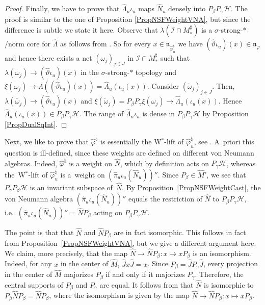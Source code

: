\documentclass[11pt]{article}
\numberwithin{equation}{section}
\theoremstyle{definition}
\newcommand{\cHil}{\mathcal{H}}
\newcommand{\nphi}{\mathfrak{n}_\varphi}
\begin{document}
\begin{proof}
Finally, we have to prove that $\hat{\Lambda}_u \iota_u$ maps $\hat{N}_u$ densely into $P_\beta P_\gamma \cHil$. The proof is similar to the one of Proposition \ref{PropNSFWeightVNA}, but since the dif\/ference is subtle we state it here. Observe that $\lambda(\mathcal{I} \cap M^\sharp_\ast)$ is a $\sigma$-strong-$\ast$/norm core for $\hat{\Lambda}$ as follows from \cite[Proposition 2.6]{KusVaeII}. So for every $x \in \mathfrak{n}_{\hat{\varphi}^\natural_u}$ we have $(\hat{\vartheta}\iota_u)(x) \in \nphi$ and hence there exists a net $(\omega_j)_{j \in J}$ in $\mathcal{I} \cap M^\sharp_\ast$ such that $\lambda(\omega_j) \rightarrow (\hat{\vartheta}\iota_u)(x)$ in the $\sigma$-strong-$\ast$ topology and $\xi(\omega_j) \rightarrow \Lambda ((\hat{\vartheta}\iota_u) (x)) = \hat{\Lambda}_u(\iota_u(x))$.  Consider $(\tilde{\omega}_j)_{j \in J}$. Then, $\lambda(\tilde{\omega_j}) \rightarrow (\hat{\vartheta}\iota_u)(x)$ and $\xi(\tilde{\omega}_j) = P_\beta P_\gamma \xi(\omega_j) \rightarrow \hat{\Lambda}_u(\iota_u(x)) $. Hence $\hat{\Lambda}_u(\iota_u(x)) \in P_\beta P_\gamma \cHil$. The range of $\hat{\Lambda}_u \iota_u$ is dense in $P_\beta P_\gamma \cHil$ by Proposition \ref{PropDualSqInt}.
\end{proof}


Next, we like to prove that $\hat{\varphi}^\natural$ is essentially the W$^\ast$-lift of $\hat{\varphi}_u^\natural$, see \cite[Def\/inition~1.31]{KusVae}. A~priori this question is ill-def\/ined, since these weights are def\/ined on dif\/ferent von Neumann algebras. Indeed, $\hat{\varphi}^\natural$ is a weight on $\hat{N}$, which by def\/inition acts on $P_\gamma \cHil$, whereas the~W$^\ast$-lift of $\hat{\varphi}_u^\natural$ is a~weight on $(\hat{\pi}_u\iota_u(\hat{N}_u)) ''$.
Since $P_\beta \in \hat{M}'$, we see that $P_\gamma P_\beta \cHil$ is an invariant subspace of~$\hat{N}$. By Proposition~\ref{PropNSFWeightCast}, the   von Neumann algebra  $(\hat{\pi}_u\iota_u(\hat{N}_u)) ''$ equals the restriction of $\hat{N}$ to $P_\beta P_\gamma \cHil$, i.e.\ $(\hat{\pi}_u\iota_u(\hat{N}_u)) '' = \hat{N} P_\beta$ acting on $P_\beta P_\gamma \cHil$.

The point is that  that $\hat{N}$ and $\hat{N} P_\beta $ are in fact isomorphic. This follows in fact from Proposition~\ref{PropNSFWeightVNA}, but we give a dif\/ferent argument here. We claim, more precisely, that the map $\hat{N} \rightarrow \hat{N} P_\beta: x \mapsto x P_\beta$ is an isomorphism.
 Indeed, for any $x$ in the center of $\hat{M}$, $\hat{J} x \hat{J} = x$. Since $P_\beta = \hat{J} P_\gamma \hat{J}$, every projection in the center of $\hat{M}$  majorizes $P_\beta$ if and only if it majorizes $P_\gamma$. Therefore, the central supports of $P_\beta$ and $P_\gamma$ are equal. It follows from \cite[Theorem~10.3.3]{KadRin} that $\hat{N}$ is isomorphic to $P_\beta \hat{N} P_\beta = \hat{N} P_\beta$, where the isomorphism is given by the map $\hat{N} \rightarrow \hat{N} P_\beta: x \mapsto x P_\beta$.
\end{document}
